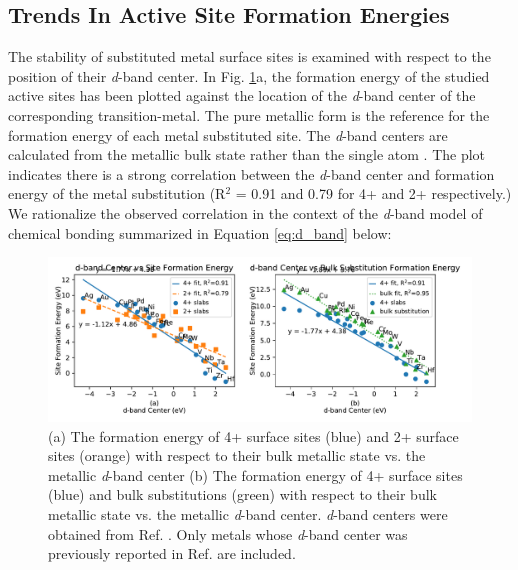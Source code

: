 
\subsection{Trends In Active Site Formation Energies}

The stability of substituted metal surface sites is examined with respect to the position of their \textit{d}-band center. In Fig. \ref{fig:d_band}a, the formation energy of the studied active sites has been plotted against the location of the \textit{d}-band center of the corresponding transition-metal. The pure metallic form is the reference for the formation energy of each metal substituted site. The \textit{d}-band centers are calculated from the metallic bulk state rather than the single atom \cite{Ruban_1997}. The plot indicates there is a strong correlation between the \textit{d}-band center and formation energy of the metal substitution (R$^2$ = 0.91 and 0.79 for 4+ and 2+ respectively.) We rationalize the observed correlation in the context of the \textit{d}-band model of chemical bonding \cite{Hammer_1995, Nilsson_2008} summarized in Equation \ref{eq:d_band} below:
\begin{figure}
    \centering
    \includegraphics[width=0.9\linewidth]{Images/d_band_vs_formation.pdf}
    \caption{(a) The formation energy of 4+ surface sites (blue) and 2+ surface sites (orange) with respect to their bulk metallic state vs. the metallic \textit{d}-band center (b) The formation energy of 4+ surface sites (blue) and bulk substitutions (green) with respect to their bulk metallic state vs. the metallic \textit{d}-band center. \textit{d}-band centers were obtained from Ref. . Only metals whose \textit{d}-band center was previously reported in Ref.  are included.}
    \label{fig:d_band}
\end{figure}

